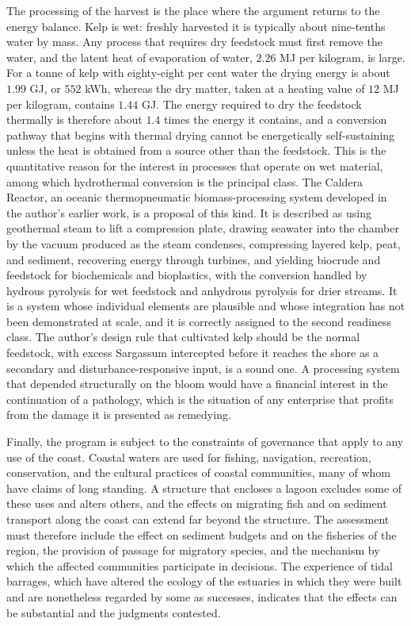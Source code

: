 The processing of the harvest is the place where the argument returns to the energy balance. Kelp is wet: freshly harvested it is typically about nine-tenths water by mass. Any process that requires dry feedstock must first remove the water, and the latent heat of evaporation of water, $2.26$ MJ per kilogram, is large. For a tonne of kelp with eighty-eight per cent water the drying energy is about $1.99$ GJ, or $552$ kWh, whereas the dry matter, taken at a heating value of $12$ MJ per kilogram, contains $1.44$ GJ. The energy required to dry the feedstock thermally is therefore about $1.4$ times the energy it contains, and a conversion pathway that begins with thermal drying cannot be energetically self-sustaining unless the heat is obtained from a source other than the feedstock. This is the quantitative reason for the interest in processes that operate on wet material, among which hydrothermal conversion is the principal class. The Caldera Reactor, an oceanic thermopneumatic biomass-processing system developed in the author's earlier work, is a proposal of this kind. It is described as using geothermal steam to lift a compression plate, drawing seawater into the chamber by the vacuum produced as the steam condenses, compressing layered kelp, peat, and sediment, recovering energy through turbines, and yielding biocrude and feedstock for biochemicals and bioplastics, with the conversion handled by hydrous pyrolysis for wet feedstock and anhydrous pyrolysis for drier streams. It is a system whose individual elements are plausible and whose integration has not been demonstrated at scale, and it is correctly assigned to the second readiness class. The author's design rule that cultivated kelp should be the normal feedstock, with excess Sargassum intercepted before it reaches the shore as a secondary and disturbance-responsive input, is a sound one. A processing system that depended structurally on the bloom would have a financial interest in the continuation of a pathology, which is the situation of any enterprise that profits from the damage it is presented as remedying.

Finally, the program is subject to the constraints of governance that apply to any use of the coast. Coastal waters are used for fishing, navigation, recreation, conservation, and the cultural practices of coastal communities, many of whom have claims of long standing. A structure that encloses a lagoon excludes some of these uses and alters others, and the effects on migrating fish and on sediment transport along the coast can extend far beyond the structure. The assessment must therefore include the effect on sediment budgets and on the fisheries of the region, the provision of passage for migratory species, and the mechanism by which the affected communities participate in decisions. The experience of tidal barrages, which have altered the ecology of the estuaries in which they were built and are nonetheless regarded by some as successes, indicates that the effects can be substantial and the judgments contested.

